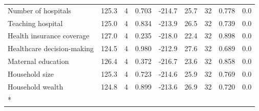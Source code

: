 \begin{longtable}[t]{lllllllll}
\hspace{1em}Number of hospitals & 125.3 & 4 & 0.703 & -214.7 & 25.7 & 32 & 0.778 & 0.0\\
\hspace{1em}Teaching hospital & 125.0 & 4 & 0.834 & -213.9 & 26.5 & 32 & 0.739 & 0.0\\
\hspace{1em}Health insurance coverage & 127.0 & 4 & 0.235 & -218.0 & 22.4 & 32 & 0.898 & 0.0\\
\hspace{1em}Healthcare decision-making & 124.5 & 4 & 0.980 & -212.9 & 27.6 & 32 & 0.689 & 0.0\\
\hspace{1em}Maternal education & 126.4 & 4 & 0.372 & -216.7 & 23.6 & 32 & 0.858 & 0.0\\
\hspace{1em}Household size & 125.3 & 4 & 0.723 & -214.6 & 25.9 & 32 & 0.769 & 0.0\\
\hspace{1em}Household wealth & 124.8 & 4 & 0.899 & -213.6 & 26.9 & 32 & 0.720 & 0.0\\*
\end{longtable}
\endgroup{}

